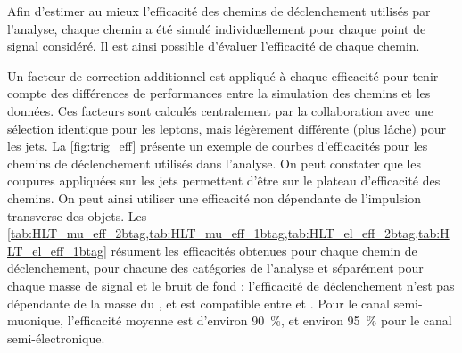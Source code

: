 Afin d'estimer au mieux l'efficacité des chemins de déclenchement utilisés par l'analyse, chaque chemin a été simulé individuellement pour chaque point de signal considéré. Il est ainsi possible d'évaluer l'efficacité de chaque chemin.

Un facteur de correction additionnel est appliqué à chaque efficacité pour tenir compte des différences de performances entre la simulation des chemins et les données. Ces facteurs sont calculés centralement par la collaboration avec une sélection identique pour les leptons, mais légèrement différente (plus lâche) pour les jets. La \cref{fig:trig_eff} présente un exemple de courbes d'efficacités pour les chemins de déclenchement utilisés dans l'analyse. On peut constater que les coupures appliquées sur les jets permettent d'être sur le plateau d'efficacité des chemins. On peut ainsi utiliser une efficacité non dépendante de l'impulsion transverse des objets. Les \cref{tab:HLT_mu_eff_2btag,tab:HLT_mu_eff_1btag,tab:HLT_el_eff_2btag,tab:HLT_el_eff_1btag} résument les efficacités obtenues pour chaque chemin de déclenchement, pour chacune des catégories de l'analyse et séparément pour chaque masse de signal et le bruit de fond \ttbar : l'efficacité de déclenchement n'est pas dépendante de la masse du \zprime, et  est compatible entre \zprime et \ttbar. Pour le canal semi-muonique, l'efficacité moyenne est d'environ \SI{90}{\%}, et environ \SI{95}{\%} pour le canal semi-électronique.



